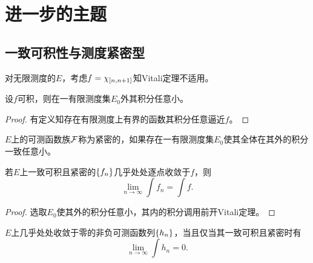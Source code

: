 \documentclass{ctexrep}
\begin{document}
  \section{进一步的主题}
  \subsection{一致可积性与测度紧密型}
  \begin{ex}
    对无限测度的$E$，考虑$f=\chi_{\left[n,n+1\right]}$知Vitali定理不适用。
  \end{ex}
  \begin{proposition}
    设$f$可积，则在一有限测度集$E_0$外其积分任意小。
  \end{proposition}
  \begin{proof}
    有定义知存在有限测度上有界的函数其积分任意逼近$f$。
  \end{proof}
  \begin{definition}
    $E$上的可测函数族$\mathcal{F}$称为紧密的，如果存在一有限测度集$E_0$使其全体在其外的积分一致任意小。
  \end{definition}
  \begin{theorem}[Vitali收敛定理]
    若$E$上一致可积且紧密的$\left\{f_n\right\}$几乎处处逐点收敛于$f$，则
    \[ \lim_{n\to\infty}\int f_n = \int f. \]
  \end{theorem}
  \begin{proof}
    选取$E_0$使其外的积分任意小，其内的积分调用前开Vitali定理。
  \end{proof}
  \begin{collary}
    $E$上几乎处处收敛于零的非负可测函数列$\left\{h_n\right\}$，当且仅当其一致可积且紧密时有
    \[ \lim_{n\to\infty}\int h_n = 0. \]
  \end{collary}
\end{document}
